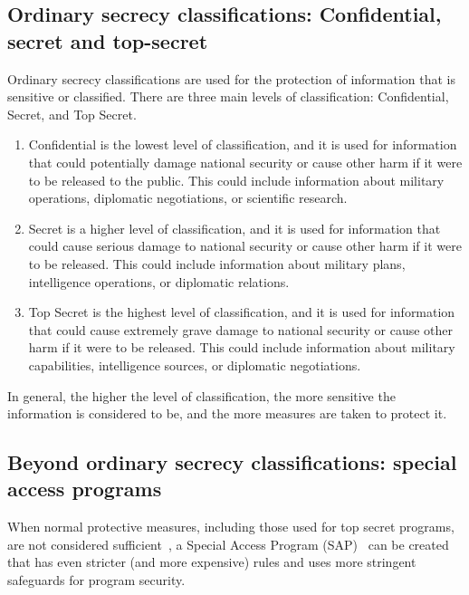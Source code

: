 \subsection{Ordinary secrecy classifications: Confidential, secret and top-secret}

Ordinary secrecy classifications are used for the protection of information that is sensitive or classified. There are three main levels of classification: Confidential, Secret, and Top Secret.

\begin{enumerate}
\item
Confidential is the lowest level of classification, and it is used for information that could potentially damage national security or cause other harm if it were to be released to the public. This could include information about military operations, diplomatic negotiations, or scientific research.

\item
Secret is a higher level of classification, and it is used for information that could cause serious damage to national security or cause other harm if it were to be released. This could include information about military plans, intelligence operations, or diplomatic relations.

\item
Top Secret is the highest level of classification, and it is used for information that could cause extremely grave damage to national security or cause other harm if it were to be released. This could include information about military capabilities, intelligence sources, or diplomatic negotiations.
\end{enumerate}

In general, the higher the level of classification, the more sensitive the information is considered to be, and the more measures are taken to protect it.

\subsection{Beyond ordinary secrecy classifications: special access programs}

When normal protective measures, including those used for top secret programs, are not considered sufficient~\cite{vanderReijden2005},
a Special Access Program (SAP)~\cite{DCSA-SAPguide,DODDirective5205.07} can be created that has even stricter (and more expensive) rules and uses more stringent safeguards for program security.

